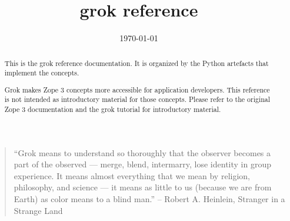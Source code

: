 \documentclass{manual}
\title{grok reference}
\date{\today}   %
\begin{document}
\maketitle

    \begin{quote}
    ``Grok means to understand so thoroughly that the observer becomes a part
    of the observed --- merge, blend, intermarry, lose identity in group
    experience. It means almost everything that we mean by religion,
    philosophy, and science --- it means as little to us (because we are from
    Earth) as color means to a blind man.'' -- Robert A. Heinlein, Stranger in
    a Strange Land
    \end{quote}

\begin{abstract}
This is the grok reference documentation. It is organized by the Python
artefacts that implement the concepts.

Grok makes Zope 3 concepts more accessible for application developers. This
reference is not intended as introductory material for those concepts. Please
refer to the original Zope 3 documentation and the grok tutorial for
introductory material.
\end{abstract}

\tableofcontents














\end{document}
